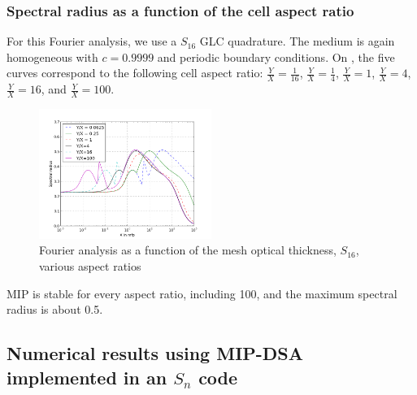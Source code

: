 \subsubsection{Spectral radius as a function of the cell aspect ratio}
For this Fourier analysis, we use a $S_{16}$ GLC quadrature. The medium is
again homogeneous with $c=0.9999$ and periodic boundary conditions. 
On , the five curves correspond to the following cell aspect 
ratio: $\frac{Y}{X}=\frac{1}{16}$, $\frac{Y}{X}=\frac{1}{4}$,
$\frac{Y}{X}=1$, $\frac{Y}{X}=4$, $\frac{Y}{X}=16$, and $\frac{Y}{X}=100$.
\begin{figure}[H]
  \centering
  \includegraphics[width=0.5\textwidth]{aspect_ratio_9999_2}
  \caption{Fourier analysis as a function of the mesh optical thickness,
  $S_{16}$, various aspect ratios}
  \label{fig_fa_ar}
\end{figure}
MIP is stable for every aspect ratio, including 100, and the maximum spectral radius
is about 0.5.

\subsection{Numerical results using MIP-DSA implemented in an $S_n$ code}
